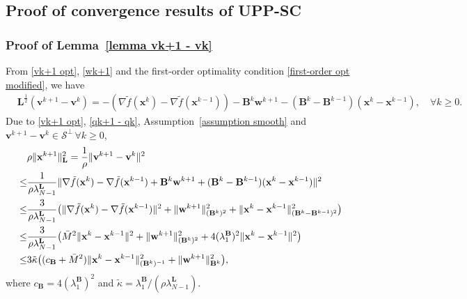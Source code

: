 \documentclass[12pt,draftcls,onecolumn]{IEEEtran}
\begin{document}
\subsection{Proof of convergence results of UPP-SC}


\subsubsection{Proof of Lemma~\ref{lemma vk+1 - vk}}\label{proof lemma vk+1 - vk}
From \eqref{vk+1 opt}, \eqref{wk+1} and the first-order optimality condition \eqref{first-order opt modified}, we have
\vspace{-0.2cm}
\begin{align}
	&\mathbf{L}^{\frac{1}{2}}(\mathbf{v}^{k+1}-\mathbf{v}^k)=-(\nabla \tilde{f}(\mathbf{x}^k)-\nabla \tilde{f}(\mathbf{x}^{k-1}))-\mathbf{B}^k\mathbf{w}^{k+1}-(\mathbf{B}^{k}-\mathbf{B}^{k-1})(\mathbf{x}^k-\mathbf{x}^{k-1}), \quad \forall k \geq 0.\label{qk+1 - qk}
\end{align}
Due to \eqref{vk+1 opt}, \eqref{qk+1 - qk}, Assumption~\ref{assumption smooth} and $\mathbf{v}^{k+1}-\mathbf{v}^k \in \mathcal{S}^{{\perp}} \,\forall k\geq 0$,
\vspace{-0.2cm}
\begin{align}
	&\rho\|\mathbf{x}^{k+1}\|^2_{\mathbf{L}}=\frac{1}{\rho}\|\mathbf{v}^{k+1}-\mathbf{v}^k\|^2\notag \\ 
    \leq& \frac{1}{\rho\lambda_{N-1}^{\mathbf{L}}}\|\nabla \tilde{f}(\mathbf{x}^k)-\nabla \tilde{f}(\mathbf{x}^{k-1})+\mathbf{B}^k\mathbf{w}^{k+1}+(\mathbf{B}^{k}-\mathbf{B}^{k-1})(\mathbf{x}^k-\mathbf{x}^{k-1})\|^2  \notag \\
	\leq &\frac{3}{\rho\lambda_{N-1}^{\mathbf{L}}}\big(\|\nabla \tilde{f}(\mathbf{x}^k)-\nabla \tilde{f}(\mathbf{x}^{k-1})\|^2+\|\mathbf{w}^{k+1}\|^2_{(\mathbf{B}^k)^2}+ \|\mathbf{x}^k-\mathbf{x}^{k-1}\|^2_{(\mathbf{B}^{k}-\mathbf{B}^{k-1})^2}\big) \notag\\
	\leq & \frac{3}{\rho\lambda_{N-1}^{\mathbf{L}}}\big(\bar{M}^2\|\mathbf{x}^k-\mathbf{x}^{k-1}\|^2+\|\mathbf{w}^{k+1}\|^2_{(\mathbf{B}^k)^2}+ 4(\lambda_1^\mathbf{B})^2\|\mathbf{x}^k-\mathbf{x}^{k-1}\|^2\big) \notag\\
	\leq &3\tilde{\kappa} \big((c_{\mathbf{B}}+\bar{M}^2)\|\mathbf{x}^k-\mathbf{x}^{k-1}\|^2_{(\mathbf{B}^{k})^{-1}}+\|\mathbf{w}^{k+1}\|^2_{\mathbf{B}^k}\big), \label{rho xk+1 leq 3 tildekappa}
\end{align}
where $c_{\mathbf{B}}=4(\lambda_1^\mathbf{B})^2$ and $\tilde{\kappa} = {\lambda_1^{\mathbf{B}}}/({\rho \lambda_{N-1}^{\mathbf{L}}})$. 
\end{document}
